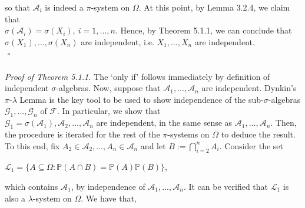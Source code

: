 \documentclass{article}
\begin{document}
so that $\mathcal{A}_i$ is indeed a $\pi$-system on $\Omega$. At this point, by Lemma 3.2.4, we claim that\\ $\sigma(\mathcal{A}_i) = \sigma(X_i), \ i=1,...,n$. Hence, by Theorem 5.1.1, we can conclude that $\sigma(X_1),...,\sigma(X_n)$ are independent, i.e. $X_1,...,X_n$ are independent.\\
${}$ \hfill $\square$ \\\\
\textit{Proof of Theorem 5.1.1.} The ‘only if’ follows immediately by definition of independent $\sigma$-algebras. Now, suppose that $\mathcal{A}_1,...,\mathcal{A}_n$ are independent. Dynkin's $\pi$-$\lambda$ Lemma is the key tool to be used to show independence of the sub-$\sigma$-algebras $\mathcal{G}_1,...,\mathcal{G}_n$ of $\mathcal{F}$. In particular, we show that \\$\mathcal{G}_1 = \sigma(\mathcal{A}_1),\mathcal{A}_2,...,\mathcal{A}_n$ are independent, in the same sense as $\mathcal{A}_1,...,\mathcal{A}_n$. Then, the procedure is iterated for the rest of the $\pi$-systems on $\Omega$ to deduce the result. To this end, fix $A_2 \in \mathcal{A}_2,...,A_n \in \mathcal{A}_n$ and let $B := \bigcap_{i=2}^{n}A_i$. Consider the set
\begin{center}
	$\mathcal{L}_1 = \{A \subseteq \Omega: \mathbb{P}(A \cap B) = \mathbb{P}(A)\mathbb{P}(B)\}$,
\end{center}
which contains $\mathcal{A}_1$, by independence of $\mathcal{A}_1,...,\mathcal{A}_n$. It can be verified that $\mathcal{L}_1$ is also a $\lambda$-system on $\Omega$. We have that,
\end{document}
